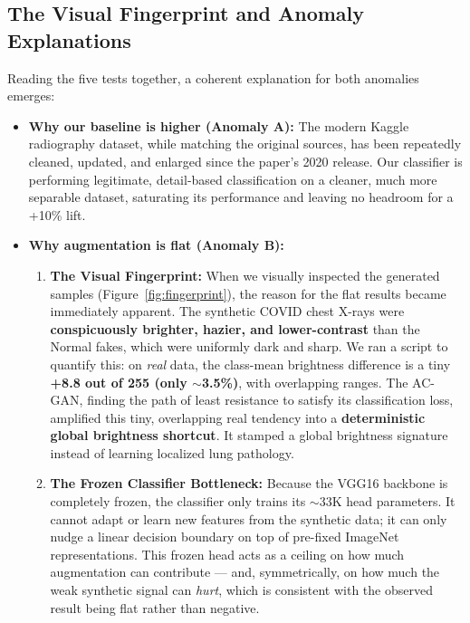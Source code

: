 \documentclass[11pt]{article}
\begin{document}
\subsection{The Visual Fingerprint and Anomaly Explanations}
Reading the five tests together, a coherent explanation for both anomalies emerges:
\begin{itemize}[nosep, leftmargin=1.5em]
  \item \textbf{Why our baseline is higher (Anomaly A):} The modern Kaggle radiography dataset, while matching the original sources, has been repeatedly cleaned, updated, and enlarged since the paper's 2020 release. Our classifier is performing legitimate, detail-based classification on a cleaner, much more separable dataset, saturating its performance and leaving no headroom for a +10\% lift.
  \item \textbf{Why augmentation is flat (Anomaly B):}
  \begin{enumerate}[label=\arabic*., nosep, leftmargin=1.5em]
    \item \textbf{The Visual Fingerprint:} When we visually inspected the generated samples (Figure~\ref{fig:fingerprint}), the reason for the flat results became immediately apparent. The synthetic COVID chest X-rays were \textbf{conspicuously brighter, hazier, and lower-contrast} than the Normal fakes, which were uniformly dark and sharp.
    We ran a script to quantify this: on \textit{real} data, the class-mean brightness difference is a tiny \textbf{+8.8 out of 255 (only $\sim$3.5\%)}, with overlapping ranges. The AC-GAN, finding the path of least resistance to satisfy its classification loss, amplified this tiny, overlapping real tendency into a \textbf{deterministic global brightness shortcut}. It stamped a global brightness signature instead of learning localized lung pathology.
    \item \textbf{The Frozen Classifier Bottleneck:} Because the VGG16 backbone is completely frozen, the classifier only trains its $\sim$33K head parameters. It cannot adapt or learn new features from the synthetic data; it can only nudge a linear decision boundary on top of pre-fixed ImageNet representations. This frozen head acts as a ceiling on how much augmentation can contribute --- and, symmetrically, on how much the weak synthetic signal can \emph{hurt}, which is consistent with the observed result being flat rather than negative.
  \end{enumerate}
\end{itemize}
\end{document}
